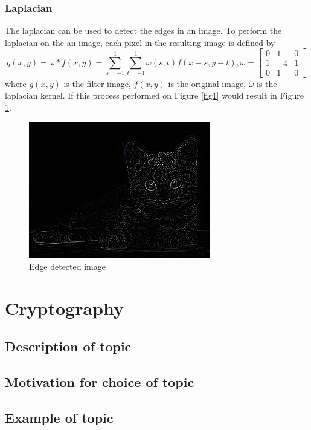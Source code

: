 \documentclass{../mathhomework}
\begin{document}
\subsubsection{Laplacian}

The laplacian can be used to detect the edges in an image. To perform the laplacian on the an image, each pixel in the resulting image is defined by
\begin{equation*}
    g(x,y) = \omega * f(x,y) = \sum^1_{s=-1} \sum^1_{t=-1} \omega(s,t) f(x - s, y - t), \omega = \begin{bmatrix}
        0 & 1 & 0 \\ 
        1 & -4 & 1 \\ 
        0 & 1 & 0
    \end{bmatrix}
\end{equation*}
where $g(x,y)$ is the filter image, $f(x,y)$ is the original image, $\omega$ is the laplacian kernel.
If this process performed on Figure \ref{fig1} would result in Figure \ref{fig5}.

\begin{figure}[H]
    \begin{center}
        \includegraphics{figures/laplacian.jpg}
    \end{center}

    \caption{Edge detected image}
    \label{fig5}
\end{figure}

\pagebreak

\section{Cryptography}

\subsection{Description of topic}

\subsection{Motivation for choice of topic}

\subsection{Example of topic}

\pagebreak



\end{document}

